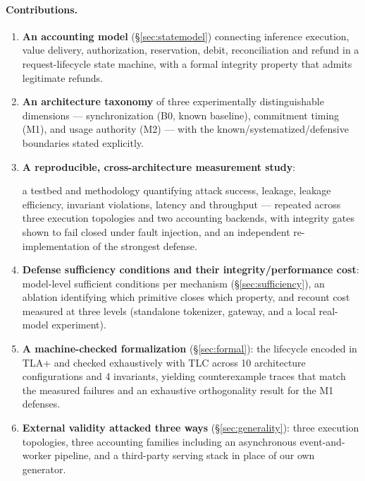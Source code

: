 \documentclass[11pt]{article}
\begin{document}
\paragraph{Contributions.}
\begin{enumerate}\itemsep2pt
\item \textbf{An accounting model} (\S\ref{sec:statemodel}) connecting inference
execution, value delivery, authorization, reservation, debit, reconciliation and refund
in a request-lifecycle state machine, with a formal integrity property that admits
legitimate refunds.
\item \textbf{An architecture taxonomy} of three experimentally distinguishable
dimensions --- synchronization (B0, known baseline), commitment timing (M1), and usage
authority (M2) --- with the known/systematized/defensive boundaries stated explicitly.
\item \textbf{A reproducible, cross-architecture measurement study}: \begin{sloppypar}a
testbed and methodology quantifying attack success, leakage, leakage efficiency,
invariant violations, latency and throughput --- repeated across three execution
topologies and two accounting backends, with integrity gates shown to fail closed under
fault injection, and an independent re-implementation of the strongest
defense.\end{sloppypar}
\item \textbf{Defense sufficiency conditions and their integrity/performance cost}:
model-level sufficient conditions per mechanism (\S\ref{sec:sufficiency}), an ablation
identifying which primitive closes which property, and recount cost measured at three
levels (standalone tokenizer, gateway, and a local real-model experiment).
\item \textbf{A machine-checked formalization} (\S\ref{sec:formal}): the lifecycle encoded
in TLA+ and checked exhaustively with TLC across 10 architecture configurations and 4
invariants, yielding counterexample traces that match the measured failures and an
exhaustive orthogonality result for the M1 defenses.
\item \textbf{External validity attacked three ways} (\S\ref{sec:generality}): three
execution topologies, three accounting families including an asynchronous
event-and-worker pipeline, and a third-party serving stack in place of our own generator.
\end{enumerate}
\end{document}
